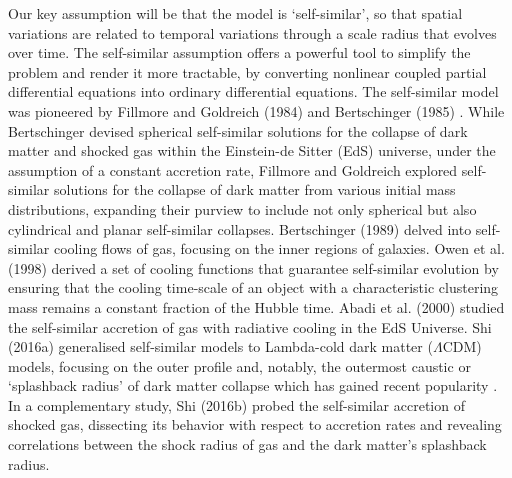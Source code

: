 \documentclass[a4paper, 12pt, oneside]{Thesis}  %
\begin{document}
Our key assumption will be that the model is `self-similar', so that spatial variations are related to temporal variations through a scale radius that evolves over time. The self-similar assumption offers a powerful tool to simplify the problem and render it more tractable, by converting nonlinear coupled partial differential equations into ordinary differential equations. The self-similar model was pioneered by Fillmore and Goldreich (1984) \cite{1984FillmoreGoldreich} and Bertschinger (1985) \cite{1985Bertschinger}. While Bertschinger devised spherical self-similar solutions for the collapse of dark matter and shocked gas within the Einstein-de Sitter (EdS) universe, under the assumption of a constant accretion rate, Fillmore and Goldreich explored self-similar solutions for the collapse of dark matter from various initial mass distributions, expanding their purview to include not only spherical but also cylindrical and planar self-similar collapses. Bertschinger (1989) \cite{1989Bertschinger} delved into self-similar cooling flows of gas, focusing on the inner regions of galaxies. Owen et al. (1998) \cite{1998OwenWeinberg_etal} derived a set of cooling functions that guarantee self-similar evolution by ensuring that the cooling time-scale of an object with a characteristic clustering mass remains a constant fraction of the Hubble time. Abadi et al. (2000) \cite{2000Abadi_etal_SelfSimCool} studied the self-similar accretion of gas with radiative cooling in the EdS Universe. Shi (2016a) \cite{2016ShiDMLamCDM} generalised self-similar models to Lambda-cold dark matter ($\Lambda$CDM) models, focusing on the outer profile and, notably, the outermost caustic or `splashback radius' of dark matter collapse which has gained recent popularity \cite{2014DiemerKrastov,2014AdhikariDalalChamberlain,2018Changetal_DES_splashback}.
In a complementary study, Shi (2016b) \cite{2016ShiICM} probed the self-similar accretion of shocked gas, dissecting its behavior with respect to accretion rates and revealing correlations between the shock radius of gas and the dark matter's splashback radius.
\end{document}
